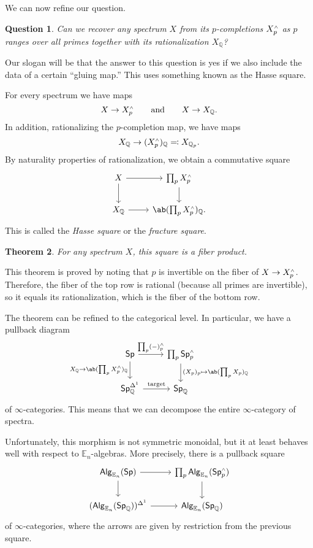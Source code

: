 \documentclass[10pt]{amsart}
\newtheorem{thm}{Theorem}[subsection]
\newtheorem{quest}[thm]{Question}
\theoremstyle{definition}
\theoremstyle{remark}
\theoremstyle{plain}
\theoremstyle{definition}
\theoremstyle{remark}
\newcommand{\Q}{\mathbb{Q}}
\newcommand{\E}{\mathbb{E}}
\newcommand{\mr}[1]{\mathrm{#1}}
\newcommand{\ms}[1]{\mathsf{#1}}
\newcommand{\1}{\mathbf{1}}
\newcommand{\2}{\mathbf{2}}
\newcommand{\3}{\mathbf{3}}
\newcommand{\sw}{\mathsmaller{\wedge}}
\begin{document}
We can now refine our question.
\begin{quest}
    Can we recover any spectrum $X$ from its $p$-completions $X_p^{\sw}$ as $p$ ranges over all primes together with its rationalization $X_{\Q}$?
\end{quest}

Our slogan will be that the answer to this question is yes if we also include the data of a certain ``gluing map.'' This uses something known as the Hasse square.

For every spectrum we have maps
\[ X \to X_p^{\sw} \qquad \text{and} \qquad X \to X_{\Q}. \]
In addition, rationalizing the $p$-completion map, we have maps
\[ X_{\Q} \to (X_p^{\sw})_{\Q} \eqqcolon X_{\Q_p}. \]
By naturality properties of rationalization, we obtain a commutative square
\begin{equation*}
\begin{tikzcd}
    X \ar{r} \ar{d} & \prod_p X_p^{\sw} \ar{d} \\
    X_{\Q} \ar{r} & \ab(\prod_p X_{p}^{\sw})_{\Q}.
\end{tikzcd}
\end{equation*}
This is called the \textit{Hasse square} or the \textit{fracture square}.

\begin{thm}
    For any spectrum $X$, this square is a fiber product.
\end{thm}

This theorem is proved by noting that $p$ is invertible on the fiber of $X \to X_p^{\sw}$. Therefore, the fiber of the top row is rational (because all primes are invertible), so it equals its rationalization, which is the fiber of the bottom row.

The theorem can be refined to the categorical level. In particular, we have a pullback diagram
\begin{equation*}
\begin{tikzcd}
    \ms{Sp} \ar{r}{\prod_p (-)_p^{\sw}} \ar{d}[swap]{X_{\Q} \to \ab(\prod_p X_p^{\sw})_{\Q}} & \prod_p \ms{Sp}_p^{\sw} \ar{d}{(X_p)_p \mapsto \ab(\prod_p X_p)_{\Q}} \\
    \ms{Sp}_{\Q}^{\Delta^1} \ar{r}{\mr{target}} & \ms{Sp}_{\Q}
\end{tikzcd}
\end{equation*}
of $\infty$-categories. This means that we can decompose the entire $\infty$-category of spectra.

Unfortunately, this morphism is not symmetric monoidal, but it at least behaves well with respect to $\E_n$-algebras. More precisely, there is a pullback square
\begin{equation*}
\begin{tikzcd}
    \ms{Alg}_{\E_n}(\ms{Sp}) \ar{r} \ar{d} & \prod_p \ms{Alg}_{\E_n}(\ms{Sp}_p^{\sw}) \ar{d} \\
    (\ms{Alg}_{\E_n}(\ms{Sp}_{\Q}))^{\Delta^1} \ar{r} & \ms{Alg}_{\E_n}(\ms{Sp}_{\Q})
\end{tikzcd}
\end{equation*}
of $\infty$-categories, where the arrows are given by restriction from the previous square.
\end{document}

